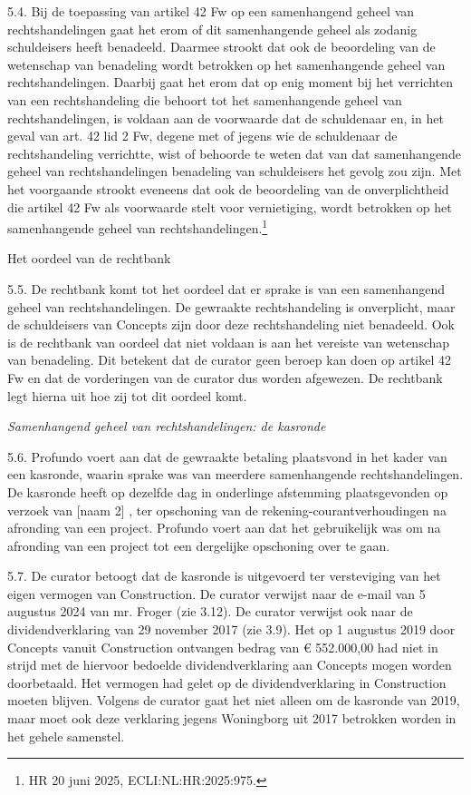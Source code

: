 \documentclass[
  dutch,
  a4paper,
]{article}
\begin{document}
5.4. Bij de toepassing van artikel 42 Fw op een samenhangend geheel van rechtshandelingen gaat het erom of dit samenhangende geheel als zodanig schuldeisers heeft benadeeld. Daarmee strookt dat ook de beoordeling van de wetenschap van benadeling wordt betrokken op het samenhangende geheel van rechtshandelingen. Daarbij gaat het erom dat op enig moment bij het verrichten van een rechtshandeling die behoort tot het samenhangende geheel van rechtshandelingen, is voldaan aan de voorwaarde dat de schuldenaar en, in het geval van art. 42 lid 2 Fw, degene met of jegens wie de schuldenaar de rechtshandeling verrichtte, wist of behoorde te weten dat van dat samenhangende geheel van rechtshandelingen benadeling van schuldeisers het gevolg zou zijn. Met het voorgaande strookt eveneens dat ook de beoordeling van de onverplichtheid die artikel 42 Fw als voorwaarde stelt voor vernietiging, wordt betrokken op het samenhangende geheel van rechtshandelingen.\footnote{HR 20 juni 2025, ECLI:NL:HR:2025:975.}

Het oordeel van de rechtbank

5.5. De rechtbank komt tot het oordeel dat er sprake is van een samenhangend geheel van rechtshandelingen. De gewraakte rechtshandeling is onverplicht, maar de schuldeisers van Concepts zijn door deze rechtshandeling niet benadeeld. Ook is de rechtbank van oordeel dat niet voldaan is aan het vereiste van wetenschap van benadeling. Dit betekent dat de curator geen beroep kan doen op artikel 42 Fw en dat de vorderingen van de curator dus worden afgewezen. De rechtbank legt hierna uit hoe zij tot dit oordeel komt.

\emph{Samenhangend geheel van rechtshandelingen: de kasronde}

5.6. Profundo voert aan dat de gewraakte betaling plaatsvond in het kader van een kasronde, waarin sprake was van meerdere samenhangende rechtshandelingen. De kasronde heeft op dezelfde dag in onderlinge afstemming plaatsgevonden op verzoek van {[}naam 2{]} , ter opschoning van de rekening-courantverhoudingen na afronding van een project. Profundo voert aan dat het gebruikelijk was om na afronding van een project tot een dergelijke opschoning over te gaan.

5.7. De curator betoogt dat de kasronde is uitgevoerd ter versteviging van het eigen vermogen van Construction. De curator verwijst naar de e-mail van 5 augustus 2024 van mr. Froger (zie 3.12). De curator verwijst ook naar de dividendverklaring van 29 november 2017 (zie 3.9). Het op 1 augustus 2019 door Concepts vanuit Construction ontvangen bedrag van € 552.000,00 had niet in strijd met de hiervoor bedoelde dividendverklaring aan Concepts mogen worden doorbetaald. Het vermogen had gelet op de dividendverklaring in Construction moeten blijven. Volgens de curator gaat het niet alleen om de kasronde van 2019, maar moet ook deze verklaring jegens Woningborg uit 2017 betrokken worden in het gehele samenstel.
\end{document}
